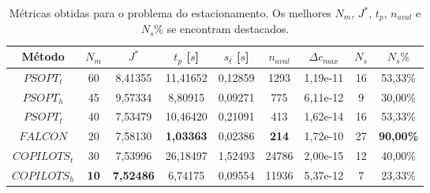 \begin{table}[h!]
	\centering
	\caption[Métricas obtidas para o problema do estacionamento]{Métricas obtidas para o problema do estacionamento. Os melhores $ N_m $, $ J^* $, $ t_p $, $ n_{aval} $ e $ N_s\% $ se encontram destacados.}
	\label{tab:estacionamento:raw}
	\begin{tabular}{@{}ccccccccc@{}}
		\toprule
		Método       & $N_m$                              & $J^*$                                   & $t_p$ {[}$s${]}                         & $s_t$ {[}$s${]} & $n_{aval}$                          & $\Delta c_{max}$                         & $N_s$ & $N_s\%$                                 \\ \midrule
		$PSOPT_t$    & 60                                 & 8,41355                                 & 11,41652                                & 0,12859         & 1293                                & 1,19e-11                                 & 16    & 53,33\%                                 \\
		$PSOPT_h$    & 45                                 & 9,57334                                 & 8,80915                                 & 0,09271         & 775                                 & 6,11e-12                                 & 9     & 30,00\%                                 \\
		$PSOPT_l$    & 40                                 & 7,53479                                 & 10,46420                                & 0,21091         & 413                                 & 1,62e-14                                 & 16    & 53,33\%                                 \\
		$FALCON$     & 20                                 & 7,58130                                 & {\color[HTML]{009901} \textbf{1,03363}} & 0,02386         & {\color[HTML]{009901} \textbf{214}} & 1,72e-10                                 & 27    & {\color[HTML]{009901} \textbf{90,00\%}} \\
		$COPILOTS_t$ & 30                                 & 7,53996                                 & 26,18497                                & 1,52493         & 24786                               & 2,00e-15 & 12    & 40,00\%                                 \\
		$COPILOTS_h$ & {\color[HTML]{009901} \textbf{10}} & {\color[HTML]{009901} \textbf{7,52486}} & 6,74175                                 & 0,09554         & 11936                               & 5,37e-12                                 & 7     & 23,33\%                                 \\ \bottomrule
	\end{tabular}
\end{table}